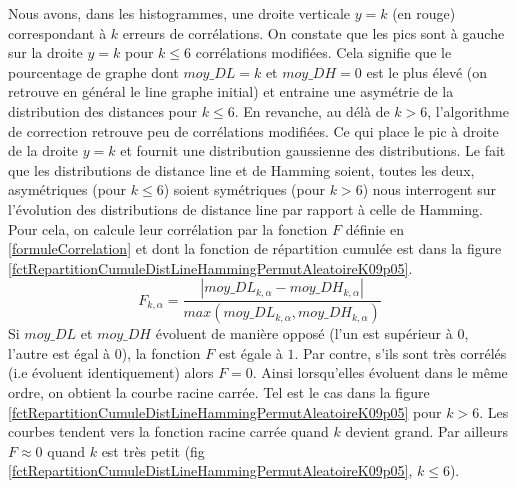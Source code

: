 \newline
Nous avons, dans les histogrammes, une droite verticale $y = k$ (en rouge) correspondant \`a $k$ erreurs de corr\'elations.
On constate que les pics sont \`a gauche sur la droite $y = k$ pour $k \le 6$ corr\'elations modifi\'ees.
Cela signifie que le pourcentage de graphe dont $moy\_DL = k$  et $moy\_DH=0$ est le plus \'elev\'e (on retrouve en g\'en\'eral le line graphe initial) et entraine une asym\'etrie de la distribution des distances pour $k \le 6$.
En revanche, au d\'el\`a de $k>6$, l'algorithme de correction retrouve peu de corr\'elations modifi\'ees. Ce qui place le pic \`a droite de la droite $y = k$ et fournit une distribution gaussienne des distributions. \newline
Le fait que les distributions de distance line et de Hamming soient, toutes les deux, asym\'etriques (pour $k \le 6$) soient sym\'etriques (pour $k>6$) nous interrogent sur l'\'evolution des distributions de distance line par rapport \`a celle de Hamming. 
 Pour cela, on calcule leur corr\'elation par la fonction $F$ d\'efinie en \ref{formuleCorrelation} et dont la fonction de r\'epartition cumul\'ee est dans la figure \ref{fctRepartitionCumuleDistLineHammingPermutAleatoireK09p05}.
\begin{equation}
\label{formuleCorrelation}
F_{k, \alpha} = \frac{ | moy\_DL_{k, \alpha} - moy\_DH_{k, \alpha} | }{ max(moy\_DL_{k, \alpha},  moy\_DH_{k, \alpha}) }
\end{equation}
Si $moy\_DL$ et $moy\_DH$ \'evoluent de mani\`ere oppos\'e (l'un est sup\'erieur \`a $0$, l'autre est \'egal \`a $0$), la fonction $F$ est \'egale \`a $1$. Par contre, s'ils sont tr\`es corr\'el\'es (i.e \'evoluent identiquement) alors $F = 0$.
Ainsi lorsqu'elles \'evoluent dans le m\^eme ordre, on obtient la courbe racine carr\'ee. Tel est le cas dans la figure \ref{fctRepartitionCumuleDistLineHammingPermutAleatoireK09p05} pour $k > 6$. 
Les courbes tendent vers la fonction racine carr\'ee quand $k$ devient grand. 
Par ailleurs $F \approx 0$ quand $k$ est tr\`es petit (fig \ref{fctRepartitionCumuleDistLineHammingPermutAleatoireK09p05}, $k \le 6$).
\newline


